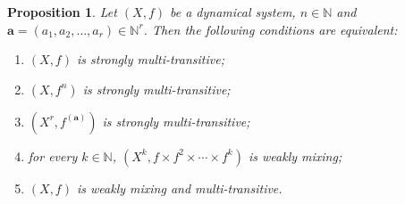 \documentclass[12pt,a4paper]{amsart}
\newtheorem{prop}[thm]{Proposition}
\theoremstyle{definition}
\numberwithin{equation}{section}
\begin{document}
\begin{prop}\label{prop:s-mul-tran-eq}
Let $(X,f)$ be a dynamical system, $n\in\mathbb{N}$ and $\mathbf{a}=(a_1,a_2,\dotsc,a_r)\in\mathbb{N}^r$.
Then the following conditions are equivalent:
\begin{enumerate}
  \item $(X,f)$ is strongly multi-transitive;
  \item $(X,f^n)$ is strongly multi-transitive;
  \item $(X^r,f^{(\mathbf{a})})$ is strongly multi-transitive;
  \item for every $k\in\mathbb{N}$, $(X^k, f\times f^2\times \dotsb \times f^k)$ is weakly mixing;
  \item $(X,f)$ is weakly mixing and multi-transitive.
\end{enumerate}
\end{prop}
\end{document}

